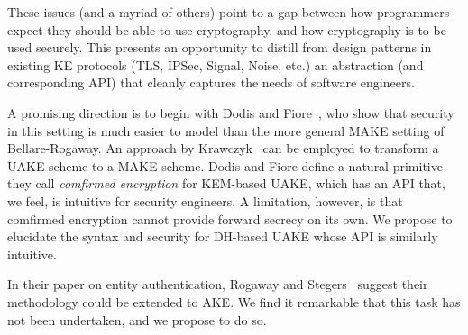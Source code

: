 These issues (and a myriad of others) point to a gap between how programmers
expect they should be able to use cryptography, and how cryptography is to
be used securely. This presents an opportunity to distill from design
patterns in existing KE protocols (TLS, IPSec, Signal, Noise, etc.) an
abstraction (and corresponding API) that cleanly captures the needs of
software engineers.

\begin{task}
  A promising direction is to begin with Dodis and
  Fiore~\cite{dodis2017unilateral}, who show that security in this setting is
  much easier to model than the more general MAKE setting of Bellare-Rogaway.
  An approach by Krawczyk~\cite{krawczyk2016unilateral-to-mutual} can be
  employed to transform a UAKE scheme to a MAKE scheme.
  Dodis and Fiore define a natural primitive they call
  \emph{comfirmed encryption} for KEM-based UAKE, which has an API that, we
  feel, is intuitive for security engineers.
  A limitation, however, is that comfirmed encryption cannot provide forward
  secrecy on its own. We propose to elucidate the syntax and security for DH-based
  UAKE whose API is similarly intuitive.
\end{task}

\begin{task}
  In their paper on entity authentication, Rogaway and Stegers~\cite{RS09}
  suggest their methodology could be extended to AKE. We find it remarkable that
  this task has not been undertaken, and we propose to do so.
\end{task}

